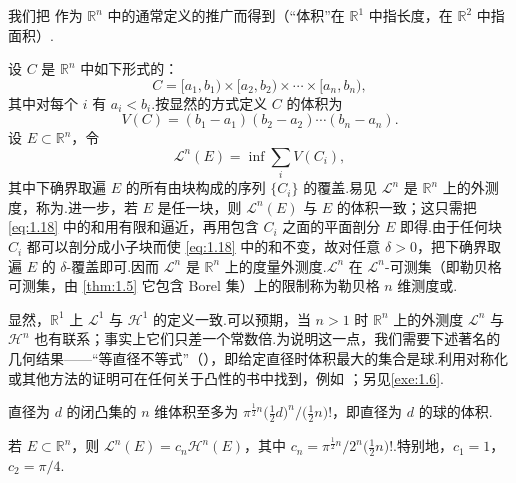 我们把 作为 $\mathbb{R}^n$ 中的通常定义的推广而得到（``体积''在 $\mathbb{R}^1$ 中指长度，在 $\mathbb{R}^2$ 中指面积）.

设 $C$ 是 $\mathbb{R}^n$ 中如下形式的：
\[
  C=[a_1,b_1)\times[a_2,b_2)\times\cdots\times[a_n,b_n),
\]
其中对每个 $i$ 有 $a_i<b_i$.按显然的方式定义 $C$ 的体积为
\[
  V(C)=(b_1-a_1)(b_2-a_2)\cdots(b_n-a_n).
\]
设 $E\subset\mathbb{R}^n$，令
\begin{equation}\label{eq:1.18}
  \mathcal{L}^{n}(E)=\inf\sum_{i}V(C_i),
\end{equation}
其中下确界取遍 $E$ 的所有由块构成的序列 $\{C_i\}$ 的覆盖.易见 $\mathcal{L}^n$ 是 $\mathbb{R}^n$ 上的外测度，称为.进一步，若 $E$ 是任一块，则 $\mathcal{L}^n(E)$ 与 $E$ 的体积一致；这只需把 \eqref{eq:1.18} 中的和用有限和逼近，再用包含 $C_i$ 之面的平面剖分 $E$ 即得.由于任何块 $C_i$ 都可以剖分成小子块而使 \eqref{eq:1.18} 中的和不变，故对任意 $\delta>0$，把下确界取遍 $E$ 的 $\delta$-覆盖即可.因而 $\mathcal{L}^n$ 是 $\mathbb{R}^n$ 上的度量外测度.$\mathcal{L}^n$ 在 $\mathcal{L}^n$-可测集（即勒贝格可测集，由 \cref{thm:1.5} 它包含 Borel 集）上的限制称为勒贝格 $n$ 维测度或.

显然，$\mathbb{R}^1$ 上 $\mathcal{L}^1$ 与 $\mathcal{H}^1$ 的定义一致.可以预期，当 $n>1$ 时 $\mathbb{R}^n$ 上的外测度 $\mathcal{L}^n$ 与 $\mathcal{H}^n$ 也有联系；事实上它们只差一个常数倍.为说明这一点，我们需要下述著名的几何结果——``等直径不等式''（），即给定直径时体积最大的集合是球.利用对称化或其他方法的证明可在任何关于凸性的书中找到，例如 \textcite{eggleston1958}；另见\cref{exe:1.6}.

\begin{theorem}\label{thm:1.11}
直径为 $d$ 的闭凸集的 $n$ 维体积至多为 $\pi^{\frac{1}{2}n}\bigl(\tfrac{1}{2}d\bigr)^{n}/\bigl(\tfrac{1}{2}n\bigr)!$，即直径为 $d$ 的球的体积.
\end{theorem}

\begin{theorem}\label{thm:1.12}
若 $E\subset\mathbb{R}^n$，则 $\mathcal{L}^n(E)=c_n\mathcal{H}^n(E)$，其中 $c_n=\pi^{\frac{1}{2}n}/2^{n}\bigl(\tfrac{1}{2}n\bigr)!$.特别地，$c_1=1$，$c_2=\pi/4$.
\end{theorem}

